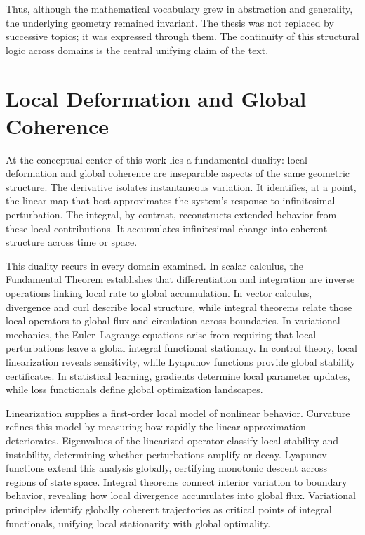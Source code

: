 \documentclass[12pt]{book}
\begin{document}
Thus, although the mathematical vocabulary grew in abstraction and
generality, the underlying geometry remained invariant. The thesis
was not replaced by successive topics; it was expressed through them.
The continuity of this structural logic across domains is the central
unifying claim of the text.

\section{Local Deformation and Global Coherence}

At the conceptual center of this work lies a fundamental duality:
local deformation and global coherence are inseparable aspects of the
same geometric structure. The derivative isolates instantaneous
variation. It identifies, at a point, the linear map that best
approximates the system’s response to infinitesimal perturbation. The
integral, by contrast, reconstructs extended behavior from these local
contributions. It accumulates infinitesimal change into coherent
structure across time or space.

This duality recurs in every domain examined. In scalar calculus, the
Fundamental Theorem establishes that differentiation and integration
are inverse operations linking local rate to global accumulation. In
vector calculus, divergence and curl describe local structure, while
integral theorems relate those local operators to global flux and
circulation across boundaries. In variational mechanics, the Euler–Lagrange
equations arise from requiring that local perturbations leave a global
integral functional stationary. In control theory, local linearization
reveals sensitivity, while Lyapunov functions provide global stability
certificates. In statistical learning, gradients determine local
parameter updates, while loss functionals define global optimization
landscapes.

Linearization supplies a first-order local model of nonlinear
behavior. Curvature refines this model by measuring how rapidly the
linear approximation deteriorates. Eigenvalues of the linearized
operator classify local stability and instability, determining whether
perturbations amplify or decay. Lyapunov functions extend this
analysis globally, certifying monotonic descent across regions of
state space. Integral theorems connect interior variation to boundary
behavior, revealing how local divergence accumulates into global flux.
Variational principles identify globally coherent trajectories as
critical points of integral functionals, unifying local stationarity
with global optimality.
\end{document}
